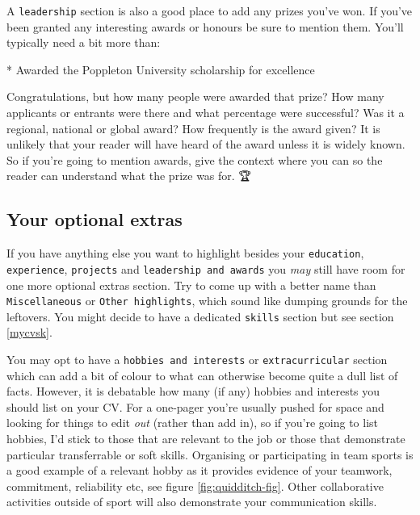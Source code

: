 \documentclass[
]{book}
\newenvironment{Shaded}{\begin{snugshade}}{\end{snugshade}}
\newcommand{\NormalTok}[1]{#1}
\newcommand{\SpecialStringTok}[1]{\textcolor[rgb]{0.31,0.60,0.02}{#1}}
\begin{document}
A \texttt{leadership} section is also a good place to add any prizes you've won. If you've been granted any interesting awards or honours be sure to mention them. You'll typically need a bit more than:

\begin{Shaded}
\begin{Highlighting}[]
\SpecialStringTok{* }\NormalTok{Awarded the Poppleton University scholarship for excellence}
\end{Highlighting}
\end{Shaded}

Congratulations, but how many people were awarded that prize? How many applicants or entrants were there and what percentage were successful? Was it a regional, national or global award? How frequently is the award given? It is unlikely that your reader will have heard of the award unless it is widely known. So if you're going to mention awards, give the context where you can so the reader can understand what the prize was for. 🏆

\hypertarget{misc}{%
\subsection{Your optional extras}\label{misc}}

If you have anything else you want to highlight besides your \texttt{education}, \texttt{experience}, \texttt{projects} and \texttt{leadership\ and\ awards} you \emph{may} still have room for one more optional extras section. Try to come up with a better name than \texttt{Miscellaneous} or \texttt{Other\ highlights}, which sound like dumping grounds for the leftovers. You might decide to have a dedicated \texttt{skills} section but see section \ref{mycvsk}.

You may opt to have a \texttt{hobbies\ and\ interests} or \texttt{extracurricular} section which can add a bit of colour to what can otherwise become quite a dull list of facts. However, it is debatable how many (if any) hobbies and interests you should list on your CV. For a one-pager you're usually pushed for space and looking for things to edit \emph{out} (rather than add in), so if you're going to list hobbies, I'd stick to those that are relevant to the job or those that demonstrate particular transferrable or soft skills. Organising or participating in team sports is a good example of a relevant hobby as it provides evidence of your teamwork, commitment, reliability etc, see figure \ref{fig:quidditch-fig}. Other collaborative activities outside of sport will also demonstrate your communication skills. \citep{hobbies}
\end{document}
